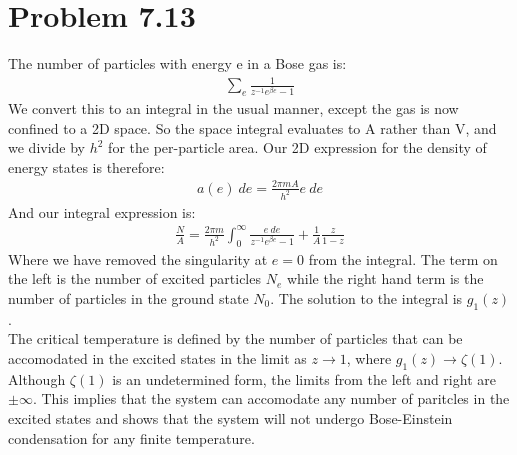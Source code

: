 \documentclass[a4paper,11pt]{article}
\numberwithin{equation}{section}
\begin{document}
\section{Problem 7.13}
The number of particles with energy e in a Bose gas is:
\begin{align}
 \sum_e \frac{1}{z^{-1}e^{\beta e}-1}
\end{align}
We convert this to an integral in the usual manner, except the gas is now confined to a 2D space.
So the space integral evaluates to A rather than V, and we divide by $h^2$ for the per-particle area.
Our 2D expression for the density of energy states is therefore:
\begin{align}
 a(e)\ de = \frac{2\pi mA}{h^2} e\ de
\end{align}
And our integral expression is:
\begin{align}
 \frac{N}{A} =\frac{2\pi m}{h^2}\int_0^\infty \frac{e\ de}{z^{-1}e^{\beta e}-1}+\frac{1}{A}\frac{z}{1-z}
\end{align}
Where we have removed the singularity at $e=0$ from the integral.
The term on the left is the number of excited particles $N_e$ while the right hand term is the number of particles in the ground state $N_0$.
The solution to the integral is $g_1(z)$.\\
The critical temperature is defined by the number of particles that can be accomodated in the excited states in the limit as $z \rightarrow 1$, where $g_1(z) \rightarrow \zeta(1)$. 
Although $\zeta(1)$ is an undetermined form, the limits from the left and right are $\pm \infty$.
This implies that the system can accomodate any number of paritcles in the excited states and shows that the system will not undergo Bose-Einstein condensation for any finite temperature.
\end{document}
